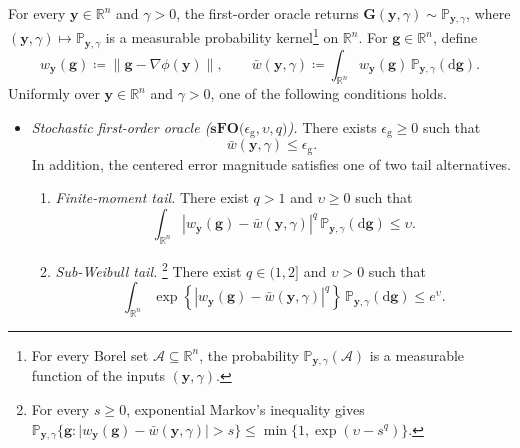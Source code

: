 \documentclass{article}
\begin{document}
\begin{assumption}
\label{FO}
For every \(\bm{y}\in\mathbb R^n\) and \(\gamma>0\), the first-order oracle
returns
\(\mathbf{G}(\bm{y},\gamma)\sim\mathbb P_{\bm{y},\gamma}\), where
\((\bm{y},\gamma)\mapsto\mathbb P_{\bm{y},\gamma}\) is a measurable probability
kernel\footnote{For every Borel set \(\mathcal{A}\subseteq\mathbb R^n\),
the probability \(\mathbb P_{\bm{y},\gamma}(\mathcal{A})\) is a measurable
function of the inputs \((\bm{y},\gamma)\).} on \(\mathbb R^n\). For \(\bm{g}\in\mathbb R^n\), define
\[
w_{\bm{y}}(\bm{g})\coloneqq \|\bm{g}-\nabla\phi(\bm{y})\|,
\qquad
\bar w(\bm{y},\gamma)\coloneqq 
\int_{\mathbb R^n}w_{\bm{y}}(\bm{g})\,\mathbb P_{\bm{y},\gamma}(\mathrm{d}\bm{g}).
\]
Uniformly over \(\bm{y}\in\mathbb R^n\) and \(\gamma>0\), one of the
following conditions holds.

\begin{itemize}
\item
\emph{Stochastic first-order oracle (\(\textbf{sFO(}\epsilon_{\mathrm{g}},\upsilon,q \textbf{)}\)).}
There exists \(\epsilon_{\mathrm{g}}\ge0\) such that
\begin{equation}\label{eq:SFO_bias}
\bar w(\bm{y},\gamma)\le\epsilon_{\mathrm{g}}.
\end{equation}
In addition, the centered error magnitude satisfies one of two tail alternatives.
\begin{enumerate}[label=\textnormal{(\alph*)},leftmargin=*]
\item
\emph{Finite-moment tail.}
There exist \(q>1\) and \(\upsilon\ge0\) such that
\begin{equation}\label{eq:SFO_moment}
\int_{\mathbb R^n}
\left|w_{\bm{y}}(\bm{g})-\bar w(\bm{y},\gamma)\right|^q\,
\mathbb P_{\bm{y},\gamma}(\mathrm{d}\bm{g})
\le\upsilon.
\end{equation}

\item
\emph{Sub-Weibull tail.}%
\footnote{For every \(s\ge0\), exponential Markov's inequality gives
\(\mathbb P_{\bm{y},\gamma}
\{\bm{g}:\lvert w_{\bm{y}}(\bm{g})-\bar w(\bm{y},\gamma)\rvert>s\}
\le\min\{1,\exp(\upsilon-s^q)\}\).}
There exist \(q\in(1,2]\) and \(\upsilon>0\) such that
\begin{equation}\label{eq:SFO_subweibull}
\int_{\mathbb R^n}
\exp\!\left\{
\left|w_{\bm{y}}(\bm{g})-\bar w(\bm{y},\gamma)\right|^q
\right\}\,
\mathbb P_{\bm{y},\gamma}(\mathrm{d}\bm{g})
\le e^{\upsilon}.
\end{equation}
\end{enumerate}


\end{itemize}
\end{assumption}
\end{document}
